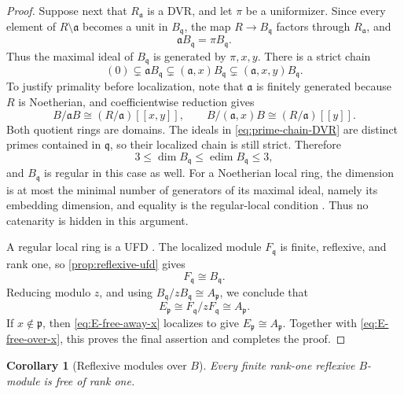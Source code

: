 \documentclass[reqno]{amsart}
\theoremstyle{plain}
\newtheorem{corollary}[theorem]{Corollary}
\theoremstyle{definition}
\begin{document}
\begin{proof}
Suppose next that $R_{\mathfrak a}$ is a DVR, and let $\pi$ be a
uniformizer.  Since every element of $R\setminus\mathfrak a$ becomes a unit
in $B_{\mathfrak q}$, the map $R\to B_{\mathfrak q}$ factors through
$R_{\mathfrak a}$, and
\[
 \mathfrak aB_{\mathfrak q}=\pi B_{\mathfrak q}.
\]
Thus the maximal ideal of $B_{\mathfrak q}$ is generated by
$\pi,x,y$.  There is a strict chain
\begin{equation}
\label{eq:prime-chain-DVR}
 (0)\subsetneq\mathfrak aB_{\mathfrak q}
 \subsetneq(\mathfrak a,x)B_{\mathfrak q}
 \subsetneq(\mathfrak a,x,y)B_{\mathfrak q}.
\end{equation}
To justify primality before localization, note that $\mathfrak a$ is
finitely generated because $R$ is Noetherian, and coefficientwise reduction
gives
\[
 B/\mathfrak aB\cong(R/\mathfrak a)[[x,y]],
 \qquad
 B/(\mathfrak a,x)B\cong(R/\mathfrak a)[[y]].
\]
Both quotient rings are domains.  The ideals in
\eqref{eq:prime-chain-DVR} are distinct primes contained in
$\mathfrak q$, so their localized chain is still strict.  Therefore
\[
 3\leq\dim B_{\mathfrak q}
 \leq\operatorname{edim}B_{\mathfrak q}\leq3,
\]
and $B_{\mathfrak q}$ is regular in this case as well.  For a Noetherian
local ring, the dimension is at most the minimal number of generators of its
maximal ideal, namely its embedding dimension, and equality is the
regular-local condition
\cite[Corollary~11.15 and Theorem~11.22]{AtiyahMacdonald}.  Thus no
catenarity is hidden in this argument.

A regular local ring is a UFD
\cite[Theorem~48, p.~142]{MatsumuraCA}.  The localized
module $F_{\mathfrak q}$ is finite, reflexive, and rank one, so
\cref{prop:reflexive-ufd} gives
\[
 F_{\mathfrak q}\cong B_{\mathfrak q}.
\]
Reducing modulo $z$, and using
$B_{\mathfrak q}/zB_{\mathfrak q}\cong A_{\mathfrak p}$, we conclude that
\begin{equation}
\label{eq:E-free-over-x}
 E_{\mathfrak p}
 \cong F_{\mathfrak q}/zF_{\mathfrak q}
 \cong A_{\mathfrak p}.
\end{equation}
If $x\notin\mathfrak p$, then \eqref{eq:E-free-away-x} localizes to give
$E_{\mathfrak p}\cong A_{\mathfrak p}$.  Together with
\eqref{eq:E-free-over-x}, this proves the final assertion and completes the
proof.
\end{proof}

\begin{corollary}[Reflexive modules over $B$]
\label{cor:reflexive-B-free}
Every finite rank-one reflexive $B$-module is free of rank one.
\end{corollary}
\end{document}

